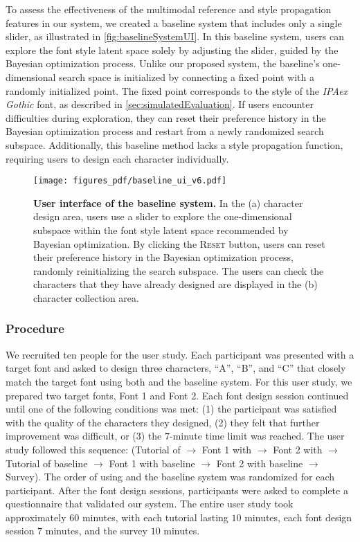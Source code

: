 To assess the effectiveness of the multimodal reference and style propagation features in our system, we created a baseline system that includes only a single slider, as illustrated in \autoref{fig:baselineSystemUI}.
In this baseline system, users can explore the font style latent space solely by adjusting the slider, guided by the Bayesian optimization process. 
Unlike our proposed system, the baseline’s one-dimensional search space is initialized by connecting a fixed point with a randomly initialized point.
The fixed point corresponds to the style of the \textit{IPAex Gothic} font, as described in \autoref{sec:simulatedEvaluation}. 
If users encounter difficulties during exploration, they can reset their preference history in the Bayesian optimization process and restart from a newly randomized search subspace.
Additionally, this baseline method lacks a style propagation function, requiring users to design each character individually.

\begin{figure}[ht]
    \centering
    \texttt{[image: figures\_pdf/baseline\_ui\_v6.pdf]}
    \caption{
    \textbf{User interface of the baseline system.}
    In the (a) character design area, users use a slider to explore the one-dimensional subspace within the font style latent space recommended by Bayesian optimization.
    By clicking the \textsc{Reset} button, users can reset their preference history in the Bayesian optimization process, randomly reinitializing the search subspace.
    The users can check the characters that they have already designed are displayed in the (b) character collection area.
}
\label{fig:baselineSystemUI}
\end{figure}

\subsubsection{Procedure}
We recruited ten people for the user study.
Each participant was presented with a target font and asked to design three characters, ``A'', ``B'', and ``C'' that closely match the target font using both \systemName and the baseline system.
For this user study, we prepared two target fonts, Font 1 and Font 2.
Each font design session continued until one of the following conditions was met: (1) the participant was satisfied with the quality of the characters they designed, (2) they felt that further improvement was difficult, or (3) the $7$-minute time limit was reached.
The user study followed this sequence: (Tutorial of \systemName $\rightarrow$ Font 1 with \systemName $\rightarrow$ Font 2 with \systemName $\rightarrow$ Tutorial of baseline $\rightarrow$ Font 1 with baseline $\rightarrow$ Font 2 with baseline $\rightarrow$ Survey).
The order of using \systemName and the baseline system was randomized for each participant.
After the font design sessions, participants were asked to complete a questionnaire that validated our system.
The entire user study took approximately $60$ minutes, with each tutorial lasting $10$ minutes, each font design session $7$ minutes, and the survey $10$ minutes.




